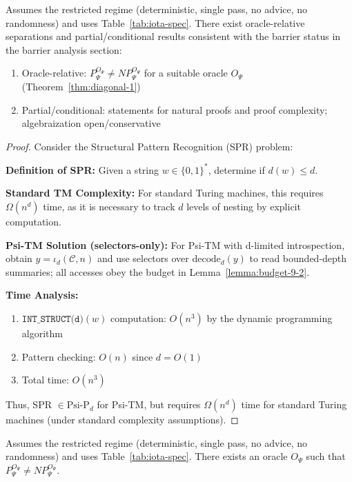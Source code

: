   \begin{theorem}
  Assumes the restricted regime (deterministic, single pass, no advice, no randomness) and uses Table~\ref{tab:iota-spec}.
  There exist oracle-relative separations and partial/conditional results consistent with the barrier status in the barrier analysis section:
  \begin{enumerate}
\item Oracle-relative: $P^{O_\Psi}_\Psi \neq NP^{O_\Psi}_\Psi$ for a suitable oracle $O_\Psi$ (Theorem~\ref{thm:diagonal-1})
  \item Partial/conditional: statements for natural proofs and proof complexity; algebraization open/conservative
  \end{enumerate}
  \end{theorem}
  
  \begin{proof}
  Consider the Structural Pattern Recognition (SPR) problem:
  
  \textbf{Definition of SPR:} 
  Given a string $w \in \{0,1\}^*$, determine if $d(w) \leq d$.
  
  \textbf{Standard TM Complexity:}
  For standard Turing machines, this requires $\Omega(n^d)$ time, as it is necessary to track $d$ levels of nesting by explicit computation.
  
  \textbf{Psi-TM Solution (selectors-only):}
  For Psi-TM with d-limited introspection, obtain $y=\iota_d(\mathcal{C},n)$ and use selectors over $\mathrm{decode}_d(y)$ to read bounded-depth summaries; all accesses obey the budget in Lemma~\ref{lemma:budget-9-2}.
  
  \textbf{Time Analysis:}
  \begin{enumerate}
  \item $\texttt{INT\_STRUCT(d)}(w)$ computation: $O(n^3)$ by the dynamic programming algorithm
  \item Pattern checking: $O(n)$ since $d = O(1)$
  \item Total time: $O(n^3)$
  \end{enumerate}
  
  Thus, SPR $\in \text{Psi-P}_d$ for Psi-TM, but requires $\Omega(n^d)$ time for standard Turing machines (under standard complexity assumptions).
  \end{proof}
  
  \begin{theorem}
  \label{thm:diagonal-1}
  Assumes the restricted regime (deterministic, single pass, no advice, no randomness) and uses Table~\ref{tab:iota-spec}.
  There exists an oracle $O_\Psi$ such that $P^{O_\Psi}_\Psi \neq NP^{O_\Psi}_\Psi$.
  \end{theorem}
  
